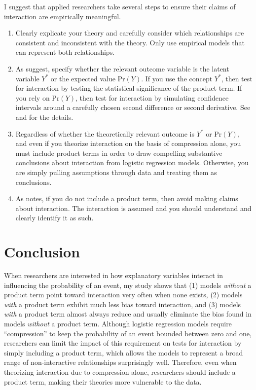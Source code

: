 \documentclass[12pt]{article}
\begin{document}
I suggest that applied researchers take several steps to ensure their claims of interaction are empirically meaningful.
\singlespace\vspace{-3mm}
\begin{enumerate}
\item Clearly explicate your theory and carefully consider which relationships are consistent and inconsistent with the theory. Only use empirical models that can represent both relationships.
\item As \cite{BerryDeMerittEsarey2010} suggest, specify whether the relevant outcome variable is the latent variable $Y^*$ or the expected value $\text{Pr}(Y)$. If you use the concept $Y^*$, then test for interaction by testing the statistical significance of the product term. If you rely on $\text{Pr}(Y)$, then test for interaction by simulating confidence intervals around a carefully chosen second difference or second derivative. See \cite{BerryDeMerittEsarey2010} and \cite{KingTomzWhittenburg2000} for the details.
\item Regardless of whether the theoretically relevant outcome is $Y^*$ or $\text{Pr}(Y)$, and even if you theorize interaction on the basis of compression alone, you  must include product terms in order to draw compelling substantive conclusions about interaction from logistic regression models. Otherwise, you are simply pulling assumptions through data and treating them as conclusions.
\item As \cite{Nagler1991} notes, if you do not include a product term, then avoid making claims about interaction. The interaction is assumed and you should understand and clearly identify it as such.
\end{enumerate}
\doublespace

\section*{Conclusion}

When researchers are interested in how explanatory variables interact in influencing the probability of an event, my study shows that (1) models \textit{without} a product term point toward interaction very often when none exists, (2) models \textit{with} a product term exhibit much less bias toward interaction, and (3) models \textit{with} a product term almost always reduce and usually eliminate the bias found in models \textit{without }a product term.  Although logistic regression models require ``compression''  to keep the probability of an event bounded between zero and one, researchers can limit the impact of this requirement on tests for interaction by simply including a product term, which allows the models to represent a  broad range of non-interactive relationships surprisingly well. Therefore, even when theorizing interaction due to compression alone, researchers should include a product term, making their theories more vulnerable to the data.\normalsize
\end{document}
